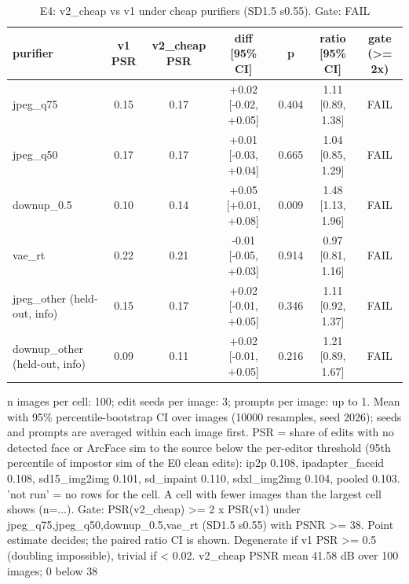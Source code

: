 \begin{table}[t]
\centering
\small
\begin{tabular}{lcccccc}
\toprule
purifier & v1 PSR & v2\_cheap PSR & diff [95\% CI] & p & ratio [95\% CI] & gate (>= 2x) \\
\midrule
jpeg\_q75 & 0.15 & 0.17 & +0.02 [-0.02, +0.05] & 0.404 & 1.11 [0.89, 1.38] & FAIL \\
jpeg\_q50 & 0.17 & 0.17 & +0.01 [-0.03, +0.04] & 0.665 & 1.04 [0.85, 1.29] & FAIL \\
downup\_0.5 & 0.10 & 0.14 & +0.05 [+0.01, +0.08] & 0.009 & 1.48 [1.13, 1.96] & FAIL \\
vae\_rt & 0.22 & 0.21 & -0.01 [-0.05, +0.03] & 0.914 & 0.97 [0.81, 1.16] & FAIL \\
jpeg\_other (held-out, info) & 0.15 & 0.17 & +0.02 [-0.01, +0.05] & 0.346 & 1.11 [0.92, 1.37] & FAIL \\
downup\_other (held-out, info) & 0.09 & 0.11 & +0.02 [-0.01, +0.05] & 0.216 & 1.21 [0.89, 1.67] & FAIL \\
\bottomrule
\end{tabular}
\caption{E4: v2\_cheap vs v1 under cheap purifiers (SD1.5 s0.55). Gate: FAIL}
\label{tab:e4}
\par\footnotesize n images per cell: 100; edit seeds per image: 3; prompts per image: up to 1. Mean with 95\% percentile-bootstrap CI over images (10000 resamples, seed 2026); seeds and prompts are averaged within each image first. PSR = share of edits with no detected face or ArcFace sim to the source below the per-editor threshold (95th percentile of impostor sim of the E0 clean edits): ip2p 0.108, ipadapter\_faceid 0.108, sd15\_img2img 0.101, sd\_inpaint 0.110, sdxl\_img2img 0.104, pooled 0.103. 'not run' = no rows for the cell. A cell with fewer images than the largest cell shows (n=...). Gate: PSR(v2\_cheap) >= 2 x PSR(v1) under jpeg\_q75,jpeg\_q50,downup\_0.5,vae\_rt (SD1.5 s0.55) with PSNR >= 38. Point estimate decides; the paired ratio CI is shown. Degenerate if v1 PSR >= 0.5 (doubling impossible), trivial if < 0.02. v2\_cheap PSNR mean 41.58 dB over 100 images; 0 below 38
\end{table}
